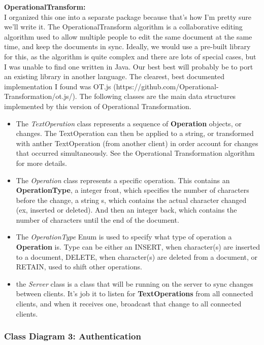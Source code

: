 \documentclass[twoside,letterpaper]{article}
\begin{document}
	\textbf{OperationalTransform:} \\\bigskip
	I organized this one into a separate package because that's how I'm pretty sure we'll write it. The OperationalTransform algorithm is a collaborative editing algorithm used to allow multiple people to edit the same document at the same time, and keep the documents in sync. Ideally, we would use a pre-built library for this, as the algorithm is quite complex and there are lots of special cases, but I was unable to find one written in Java. Our best best will probably be to port an existing library in another language. The clearest, best documented implementation I found was OT.js (https://github.com/Operational-Transformation/ot.js/). The following classes are the main data structures implemented by this version of Operational Transformation.
	\begin{itemize}
	\item The \textit{TextOperation} class represents a sequence of \textbf{Operation} objects, or changes. The TextOperation can then be applied to a string, or transformed with anther TextOperation (from another client) in order account for changes that occurred simultaneously. See the Operational Transformation algorithm for more details.
	\item The \textit{Operation} class represents a specific operation. This contains an \textbf{OperationType}, a integer front, which specifies the number of characters before the change, a string s, which contains the actual character changed (ex, inserted or deleted). And then an integer back, which contains the number of characters until the end of the document.
	\item The \textit{OperationType} Enum is used to specify what type of operation a \textbf{Operation} is. Type can be either an INSERT, when character(s) are inserted to a document, DELETE, when character(s) are deleted from a document, or RETAIN, used to shift other operations.
	\item the \textit{Server} class is a class that will be running on the server to sync changes between clients. It's job it to listen for \textbf{TextOperations} from all connected clients, and when it receives one, broadcast that change to all connected clients.
	\end{itemize}
	\newpage
	\subsubsection[Class Diagram 3: Authentication]{\rmfamily\bfseries\color{black}
		Class Diagram 3: Authentication}
	\hypertarget{RefHeading22059017292}{}
	\bigskip
	
\end{document}
